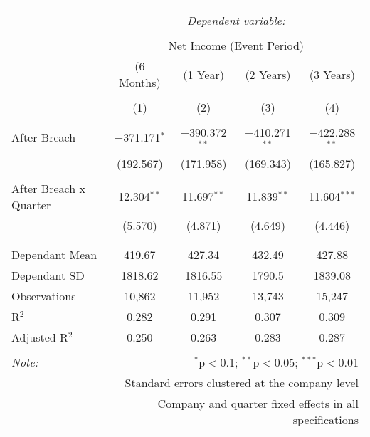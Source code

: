
\begin{table}[!htbp] \centering 
  \caption{} 
  \label{} 
\begin{tabular}{@{\extracolsep{5pt}}lcccc} 
\\[-1.8ex]\hline 
\hline \\[-1.8ex] 
 & \multicolumn{4}{c}{\textit{Dependent variable:}} \\ 
\cline{2-5} 
\\[-1.8ex] & \multicolumn{4}{c}{Net Income (Event Period)} \\ 
 & (6 Months) & (1 Year) & (2 Years) & (3 Years) \\ 
\\[-1.8ex] & (1) & (2) & (3) & (4)\\ 
\hline \\[-1.8ex] 
 After Breach & $-$371.171$^{*}$ & $-$390.372$^{**}$ & $-$410.271$^{**}$ & $-$422.288$^{**}$ \\ 
  & (192.567) & (171.958) & (169.343) & (165.827) \\ 
  & & & & \\ 
 After Breach x Quarter & 12.304$^{**}$ & 11.697$^{**}$ & 11.839$^{**}$ & 11.604$^{***}$ \\ 
  & (5.570) & (4.871) & (4.649) & (4.446) \\ 
  & & & & \\ 
\hline \\[-1.8ex] 
Dependant Mean & 419.67 & 427.34 & 432.49 & 427.88 \\ 
Dependant SD & 1818.62 & 1816.55 & 1790.5 & 1839.08 \\ 
Observations & 10,862 & 11,952 & 13,743 & 15,247 \\ 
R$^{2}$ & 0.282 & 0.291 & 0.307 & 0.309 \\ 
Adjusted R$^{2}$ & 0.250 & 0.263 & 0.283 & 0.287 \\ 
\hline 
\hline \\[-1.8ex] 
\textit{Note:}  & \multicolumn{4}{r}{$^{*}$p$<$0.1; $^{**}$p$<$0.05; $^{***}$p$<$0.01} \\ 
 & \multicolumn{4}{r}{Standard errors clustered at the company level} \\ 
 & \multicolumn{4}{r}{Company and quarter fixed effects in all specifications} \\ 
\end{tabular} 
\end{table} 
